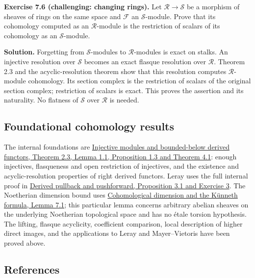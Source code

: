 \documentclass[11pt]{article}
\begin{document}
\textbf{Exercise 7.6 (challenging: changing rings).} Let
\(\mathcal R\to\mathcal S\) be a morphism of sheaves of rings on the
same space and \(\mathcal F\) an \(\mathcal S\)-module. Prove that its
cohomology computed as an \(\mathcal R\)-module is the restriction of
scalars of its cohomology as an \(\mathcal S\)-module.

\textbf{Solution.} Forgetting from \(\mathcal S\)-modules to
\(\mathcal R\)-modules is exact on stalks. An injective resolution over
\(\mathcal S\) becomes an exact flasque resolution over \(\mathcal R\).
Theorem 2.3 and the acyclic-resolution theorem show that this resolution
computes \(\mathcal R\)-module cohomology. Its section complex is the
restriction of scalars of the original section complex; restriction of
scalars is exact. This proves the assertion and its naturality. No
flatness of \(\mathcal S\) over \(\mathcal R\) is needed.

\subsection{Foundational cohomology
results}\label{foundational-cohomology-results}

The internal foundations are
\href{../derived-categories-and-sheaf-operations/injective-modules-and-bounded-below-derived-functors.html}{Injective
modules and bounded-below derived functors, Theorem 2.3, Lemma 1.1,
Proposition 1.3 and Theorem 4.1}: enough injectives, flasqueness and
open restriction of injectives, and the existence and acyclic-resolution
properties of right derived functors. Leray uses the full internal proof
in
\href{../derived-categories-and-sheaf-operations/derived-pullback-and-pushforward.html}{Derived
pullback and pushforward, Proposition 3.1 and Exercise 3}. The
Noetherian dimension bound uses
\href{../ag-etale-cohomology/cohomological-dimension-and-the-kunneth-formula.html\#7-the-bound-for-all-finite-type-schemes}{Cohomological
dimension and the Künneth formula, Lemma 7.1}; this particular lemma
concerns arbitrary abelian sheaves on the underlying Noetherian
topological space and has no étale torsion hypothesis. The lifting,
flasque acyclicity, coefficient comparison, local description of higher
direct images, and the applications to Leray and Mayer--Vietoris have
been proved above.

\subsection{References}\label{references}
\end{document}
